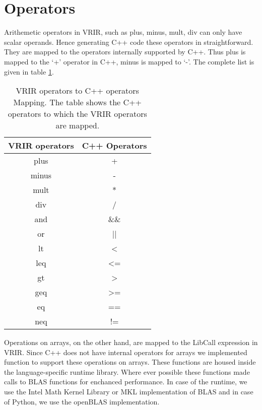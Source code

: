 \section{Operators}
\label{sec:operators}
Arithemetic operators in VRIR, such as plus, minus, mult, div can only have scalar operands. Hence generating C++ code these operators in straightforward. They are mapped to the operators internally supported by C++. Thus plus is mapped to the `+' operator in C++, minus is mapped to `-'. The complete list is given in table \ref{tab:opMap}. \\
\begin{table}[h]
\centering
\begin{tabular}{|c|c|}
\hline
VRIR operators & C++ Operators \\ \hline
plus           & +             \\ \hline
minus          & -             \\ \hline
mult           & *             \\ \hline
div            & /             \\ \hline
and            & \&\&           \\ \hline
or             & ||            \\ \hline
lt             & \textless     \\ \hline
leq            & \textless=    \\ \hline
gt             & \textgreater  \\ \hline
geq            & \textgreater= \\ \hline
eq             & ==            \\ \hline
neq            & !=            \\ \hline
\end{tabular}
\caption[opMap]{VRIR operators to C++ operators Mapping. The table shows the C++ operators to which the VRIR operators are mapped.}
\label{tab:opMap}
\end{table}
Operations on arrays, on the other hand, are mapped to the LibCall expression in VRIR. Since C++ does not have internal operators for arrays we implemented function to support these operations on arrays. These functions are housed inside the language-specific runtime library. Where ever possible these functions made calls to BLAS functions for enchanced performance. In case of the \matlab\cite{matlab} runtime, we use the Intel Math Kernel Library\cite{mkl} or MKL implementation of BLAS and in case of Python\cite{python}, we use the openBLAS\cite{openblas} implementation.

